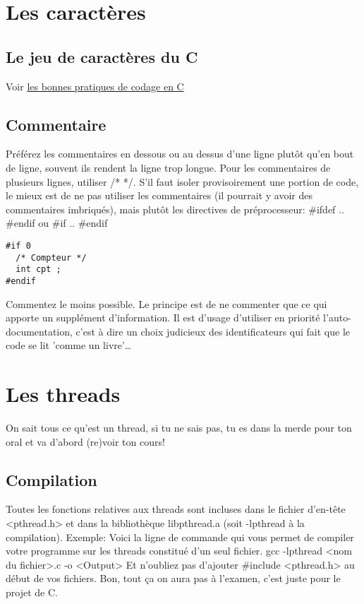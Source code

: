 \documentclass[a4paper]{article}
\begin{document}
\section{Les caractères}
\subsection{Le jeu de caractères du C}
Voir \href{http://emmanuel-delahaye.developpez.com/tutoriels/c/bonnes-pratiques-codage-c/#LI-A}{les bonnes pratiques de codage en C}
\subsection{Commentaire}
Préférez les commentaires en dessous ou au dessus d'une ligne plutôt qu'en bout de ligne, souvent ils rendent la ligne trop longue. \newline
Pour les commentaires de plusieurs lignes, utiliser /* */.\newline
S'il faut isoler provisoirement une portion de code, le mieux est de ne pas utiliser les commentaires (il pourrait y avoir des commentaires imbriqués), mais plutôt les directives de préprocesseur: \#ifdef .. \#endif ou \#if .. \#endif

\begin{lstlisting}
#if 0
  /* Compteur */
  int cpt ;
#endif
\end{lstlisting}
Commentez le moins possible. Le principe est de ne commenter que ce qui apporte un supplément d'information. Il est d'usage d'utiliser en priorité l'auto-documentation, c'est à dire un choix judicieux des identificateurs qui fait que le code se lit 'comme un livre'…
\section{Les threads}
On sait tous ce qu'est un thread, si tu ne sais pas, tu es dans la merde pour ton oral et va d'abord (re)voir ton cours!
\subsection{Compilation}
Toutes les fonctions relatives aux threads sont incluses dans le fichier d'en-tête <pthread.h> et dans la bibliothèque libpthread.a (soit -lpthread à la compilation).\newline
Exemple:\newline
Voici la ligne de commande qui vous permet de compiler votre programme sur les threads constitué d'un seul fichier.\newline
gcc -lpthread <nom du fichier>.c -o <Output>\newline
Et n'oubliez pas d'ajouter \#include <pthread.h> au début de vos fichiers.
Bon, tout ça on aura pas à l'examen, c'est juste pour le projet de C.
\end{document}
